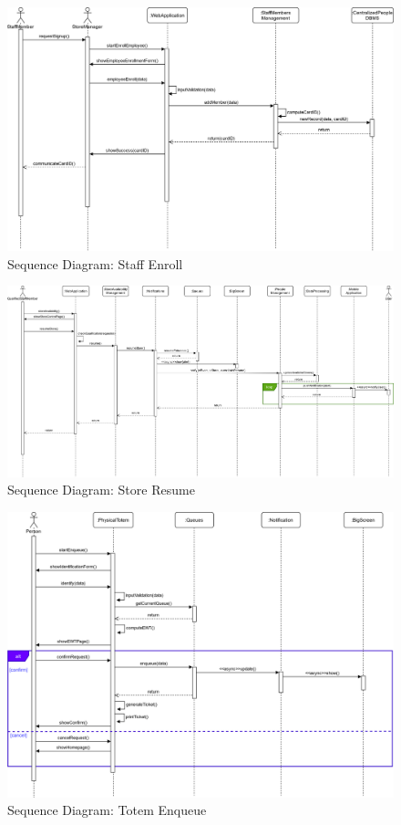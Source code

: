 \begin{figure}[H]
	\includegraphics[width=\linewidth]{../Diagrams/Sequence/sequence_staff_enroll.png}
	\caption{Sequence Diagram: Staff Enroll}
	\label{fig:sStaffEn}
\end{figure}
\begin{figure}[H]
	\includegraphics[width=\linewidth]{../Diagrams/Sequence/sequence_store_resume.png}
	\caption{Sequence Diagram: Store Resume}
	\label{fig:sStoreRes}
\end{figure}
\begin{figure}[H]
	\includegraphics[width=\linewidth]{../Diagrams/Sequence/sequence_totem_enqueue.png}
	\caption{Sequence Diagram: Totem Enqueue}
	\label{fig:sTotemEnq}
\end{figure}

